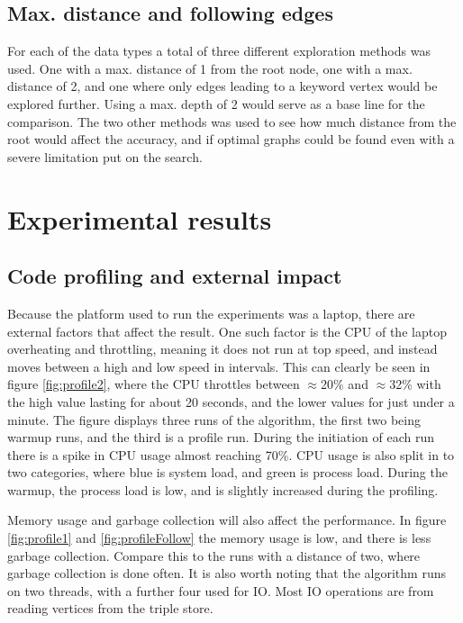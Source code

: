 \subsection{Max. distance and following edges}
For each of the data types a total of three different exploration methods was used. One with a max. distance of 1 from the root node, one with a max. distance of 2, and one where only edges leading to a keyword vertex would be explored further. Using a max. depth of 2 would serve as a base line for the comparison. The two other methods was used to see how much distance from the root would affect the accuracy, and if optimal graphs could be found even with a severe limitation put on the search.

\section{Experimental results}
\label{sec:experimentalResults}
\subsection{Code profiling and external impact}
Because the platform used to run the experiments was a laptop, there are external factors that affect the result. One such factor is the CPU of the laptop overheating and throttling, meaning it does not run at top speed, and instead moves between a high and low speed in intervals. This can clearly be seen in figure \ref{fig:profile2}, where the CPU throttles between $\approx$20\% and $\approx$32\% with the high value lasting for about 20 seconds, and the lower values for just under a minute. The figure displays three runs of the algorithm, the first two being warmup runs, and the third is a profile run. During the initiation of each run there is a spike in CPU usage almost reaching 70\%. CPU usage is also split in to two categories, where blue is system load, and green is process load. During the warmup, the process load is low, and is slightly increased during the profiling.

Memory usage and garbage collection will also affect the performance. In figure \ref{fig:profile1} and \ref{fig:profileFollow} the memory usage is low, and there is less garbage collection. Compare this to the runs with a distance of two, where garbage collection is done often. It is also worth noting that the algorithm runs on two threads, with a further four used for IO. Most IO operations are from reading vertices from the triple store.

